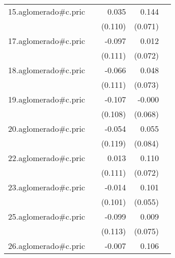 {\begin{longtable}{l*{4}{D{.}{.}{-1}}}
\addlinespace
15.aglomerado#c.pric&                     &       0.035         &       0.144\sym{*}  &                     \\
            &                     &     (0.110)         &     (0.071)         &                     \\
\addlinespace
17.aglomerado#c.pric&                     &      -0.097         &       0.012         &                     \\
            &                     &     (0.111)         &     (0.072)         &                     \\
\addlinespace
18.aglomerado#c.pric&                     &      -0.066         &       0.048         &                     \\
            &                     &     (0.111)         &     (0.073)         &                     \\
\addlinespace
19.aglomerado#c.pric&                     &      -0.107         &      -0.000         &                     \\
            &                     &     (0.108)         &     (0.068)         &                     \\
\addlinespace
20.aglomerado#c.pric&                     &      -0.054         &       0.055         &                     \\
            &                     &     (0.119)         &     (0.084)         &                     \\
\addlinespace
22.aglomerado#c.pric&                     &       0.013         &       0.110         &                     \\
            &                     &     (0.111)         &     (0.072)         &                     \\
\addlinespace
23.aglomerado#c.pric&                     &      -0.014         &       0.101         &                     \\
            &                     &     (0.101)         &     (0.055)         &                     \\
\addlinespace
25.aglomerado#c.pric&                     &      -0.099         &       0.009         &                     \\
            &                     &     (0.113)         &     (0.075)         &                     \\
\addlinespace
26.aglomerado#c.pric&                     &      -0.007         &       0.106         &                     \\

\end{longtable}}
